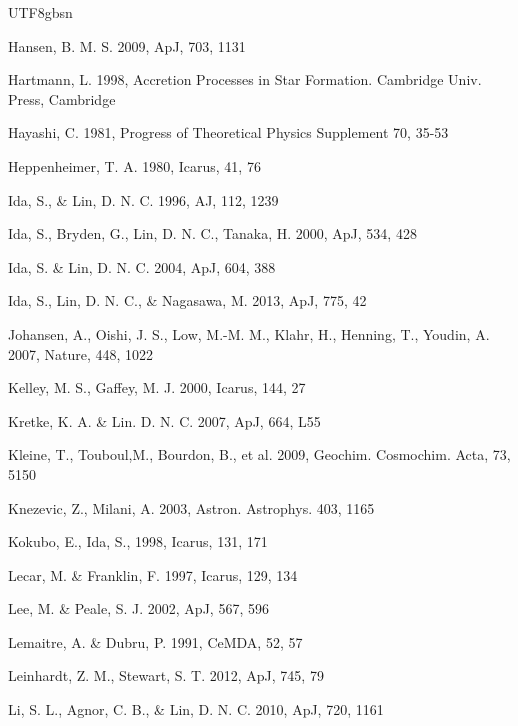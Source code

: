 \documentclass[tighten]{aastex6}
\begin{document}
\begin{CJK*}{UTF8}{gbsn}
\begin{thebibliography}{}
 Hansen, B. M. S. 2009, ApJ, 703, 1131

 Hartmann, L. 1998, Accretion Processes in Star Formation. Cambridge Univ. Press, Cambridge

 Hayashi, C. 1981, Progress of 
Theoretical Physics Supplement 70, 35-53

 Heppenheimer, T. A. 
1980, Icarus, 41, 76

 Ida, S., \& Lin, D. N. C. 1996, AJ, 112, 1239

 Ida, S., Bryden, G., Lin, D. N. C., Tanaka, H. 2000, ApJ, 534, 428

 Ida, S. \& Lin, D. N. C. 2004, ApJ, 604, 388

 Ida, S., Lin, D. N. C., \& Nagasawa, M. 2013, ApJ, 775, 42


 Johansen, A., Oishi, 
J. S., Low, M.-M. M., Klahr, H., Henning, T., Youdin, A. 2007, Nature, 448, 1022

 Kelley, M. S., Gaffey, M. J. 2000, Icarus, 144, 27

 Kretke, K. A. \& Lin. D. N. C. 2007, ApJ, 664, L55

 Kleine, T., Touboul,M., Bourdon, B., et al. 2009, Geochim. Cosmochim. Acta, 73, 5150

 Knezevic, Z., Milani, A. 2003, Astron. Astrophys. 403, 1165


 Kokubo, E., Ida, S., 1998, Icarus, 131, 171


 Lecar, M. \& Franklin, F. 1997, Icarus, 129, 134

 Lee, M. \& Peale, S. J. 2002, ApJ, 567, 596

 Lemaitre, A. \& Dubru, P. 1991, CeMDA, 52, 57

 Leinhardt, Z. M., Stewart, S. T. 2012, ApJ, 745, 79


 Li, S. L., Agnor, C. B., \& Lin, D. N. C. 2010, ApJ, 720, 1161


\end{thebibliography}
\end{CJK*}
\end{document}
